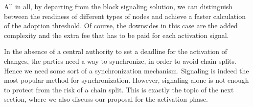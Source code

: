 All in all, by departing from the block signaling solution, we can distinguish between the readiness of different types of nodes and achieve a faster calculation of the adoption threshold. Of course, the downsides in this case are the  added complexity and the extra fee that has to be paid for each activation signal.

In the absence of a central authority to set a deadline for the activation of changes, the parties need a way to synchronize, in order to avoid chain splits. Hence we need some sort of a synchronization mechanism. Signaling is indeed the most popular method for synchronization. However, signaling alone is not enough to protect from the risk of a chain split. This is exactly the topic of the next section, where we also discuss our proposal for the activation phase.



